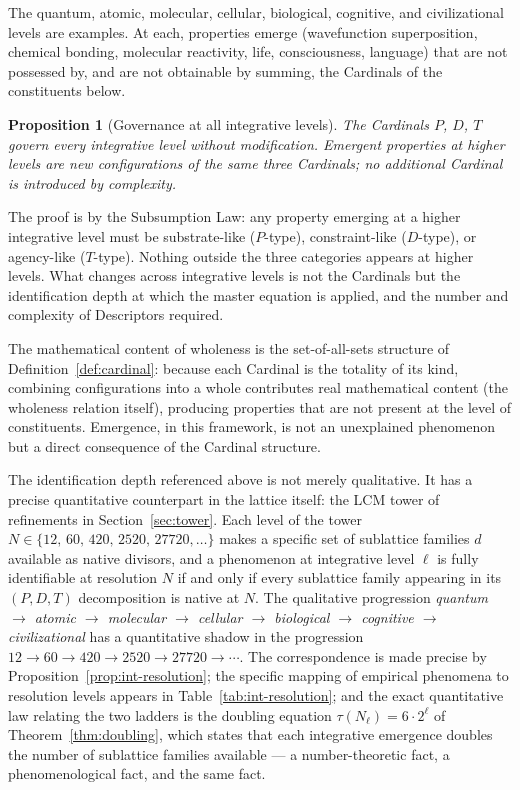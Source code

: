 \documentclass[11pt,a4paper]{article}
\newtheorem{proposition}[theorem]{Proposition}
\theoremstyle{definition}
\theoremstyle{remark}
\begin{document}
The quantum, atomic, molecular, cellular, biological, cognitive, and civilizational levels are examples. At each, properties emerge (wavefunction superposition, chemical bonding, molecular reactivity, life, consciousness, language) that are not possessed by, and are not obtainable by summing, the Cardinals of the constituents below.

\begin{proposition}[Governance at all integrative levels]\label{prop:governance}
The Cardinals $P$, $D$, $T$ govern every integrative level without modification. Emergent properties at higher levels are new configurations of the same three Cardinals; no additional Cardinal is introduced by complexity.
\end{proposition}

The proof is by the Subsumption Law: any property emerging at a higher integrative level must be substrate-like ($P$-type), constraint-like ($D$-type), or agency-like ($T$-type). Nothing outside the three categories appears at higher levels. What changes across integrative levels is not the Cardinals but the identification depth at which the master equation is applied, and the number and complexity of Descriptors required.

The mathematical content of wholeness is the set-of-all-sets structure of Definition~\ref{def:cardinal}: because each Cardinal is the totality of its kind, combining configurations into a whole contributes real mathematical content (the wholeness relation itself), producing properties that are not present at the level of constituents. Emergence, in this framework, is not an unexplained phenomenon but a direct consequence of the Cardinal structure.

The identification depth referenced above is not merely qualitative. It has a precise quantitative counterpart in the lattice itself: the LCM tower of refinements in Section~\ref{sec:tower}. Each level of the tower $N \in \{12,\,60,\,420,\,2520,\,27720,\ldots\}$ makes a specific set of sublattice families $d$ available as native divisors, and a phenomenon at integrative level $\ell$ is fully identifiable at resolution $N$ if and only if every sublattice family appearing in its $(P,D,T)$ decomposition is native at $N$. The qualitative progression \emph{quantum $\to$ atomic $\to$ molecular $\to$ cellular $\to$ biological $\to$ cognitive $\to$ civilizational} has a quantitative shadow in the progression $12 \to 60 \to 420 \to 2520 \to 27720 \to \cdots$. The correspondence is made precise by Proposition~\ref{prop:int-resolution}; the specific mapping of empirical phenomena to resolution levels appears in Table~\ref{tab:int-resolution}; and the exact quantitative law relating the two ladders is the doubling equation $\tau(N_{\ell}) = 6\cdot 2^{\ell}$ of Theorem~\ref{thm:doubling}, which states that each integrative emergence doubles the number of sublattice families available --- a number-theoretic fact, a phenomenological fact, and the same fact.
\end{document}
